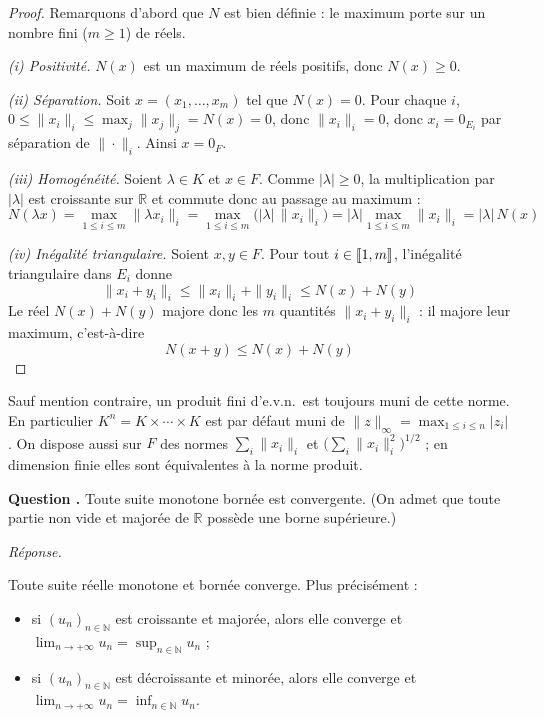 \documentclass[11pt]{article}
\newcounter{qnum}
\newcommand{\question}[1]{%
\stepcounter{qnum}%
\bigskip
\noindent\textbf{Question \theqnum.} #1\par}
\newcommand{\reponse}{\noindent\textit{Réponse.}\ }
\begin{document}
\begin{proof}
Remarquons d'abord que $N$ est bien définie : le maximum porte sur un nombre fini ($m\geq 1$) de réels.

\emph{(i) Positivité.} $N(x)$ est un maximum de réels positifs, donc $N(x)\geq 0$.

\emph{(ii) Séparation.} Soit $x=(x_1,\dots,x_m)$ tel que $N(x)=0$. Pour chaque $i$, $0\leq\|x_i\|_i\leq\max_j\|x_j\|_j=N(x)=0$, donc $\|x_i\|_i=0$, donc $x_i=0_{E_i}$ par séparation de $\|\cdot\|_i$. Ainsi $x=0_F$.

\emph{(iii) Homogénéité.} Soient $\lambda\in K$ et $x\in F$. Comme $|\lambda|\geq 0$, la multiplication par $|\lambda|$ est croissante sur $\mathbb{R}$ et commute donc au passage au maximum :
\[N(\lambda x) = \max_{1\leq i\leq m}\|\lambda x_i\|_i = \max_{1\leq i\leq m}\big(|\lambda|\,\|x_i\|_i\big) = |\lambda|\max_{1\leq i\leq m}\|x_i\|_i = |\lambda|\,N(x)\]

\emph{(iv) Inégalité triangulaire.} Soient $x,y\in F$. Pour tout $i\in\llbracket 1,m \rrbracket$, l'inégalité triangulaire dans $E_i$ donne
\[\|x_i+y_i\|_i \leq \|x_i\|_i+\|y_i\|_i \leq N(x)+N(y)\]
Le réel $N(x)+N(y)$ majore donc les $m$ quantités $\|x_i+y_i\|_i$ : il majore leur maximum, c'est-à-dire
\[N(x+y) \leq N(x)+N(y)\]
\end{proof}

\begin{remarque}
Sauf mention contraire, un produit fini d'e.v.n.\ est toujours muni de cette norme. En particulier $K^n=K\times\cdots\times K$ est par défaut muni de $\|z\|_\infty=\max_{1\leq i\leq n}|z_i|$. On dispose aussi sur $F$ des normes $\sum_i\|x_i\|_i$ et $\big(\sum_i\|x_i\|_i^2\big)^{1/2}$ ; en dimension finie elles sont équivalentes à la norme produit.
\end{remarque}

\question{Toute suite monotone bornée est convergente. (On admet que toute partie non vide et majorée de $\mathbb{R}$ possède une borne supérieure.)}
\reponse

\begin{theo}
\label{theo:limite-monotone}
Toute suite réelle monotone et bornée converge. Plus précisément :
\begin{itemize}
\item si $(u_n)_{n\in\mathbb{N}}$ est croissante et majorée, alors elle converge et $\displaystyle\lim_{n\to+\infty}u_n = \sup_{n\in\mathbb{N}}u_n$ ;
\item si $(u_n)_{n\in\mathbb{N}}$ est décroissante et minorée, alors elle converge et $\displaystyle\lim_{n\to+\infty}u_n = \inf_{n\in\mathbb{N}}u_n$.
\end{itemize}
\end{theo}
\end{document}

